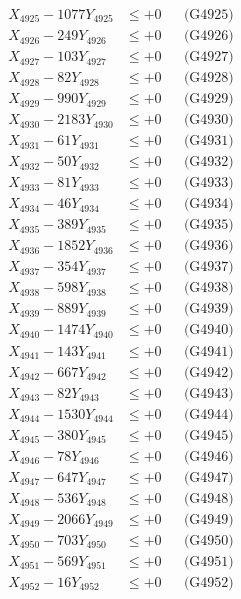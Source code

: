 \documentclass[a4paper,10pt]{article}
\begin{document}
{\begin{align}
X_{4925} - 1077Y_{4925} &\leq +0 && \text{(G4925)} \\
X_{4926} - 249Y_{4926} &\leq +0 && \text{(G4926)} \\
X_{4927} - 103Y_{4927} &\leq +0 && \text{(G4927)} \\
X_{4928} - 82Y_{4928} &\leq +0 && \text{(G4928)} \\
X_{4929} - 990Y_{4929} &\leq +0 && \text{(G4929)} \\
X_{4930} - 2183Y_{4930} &\leq +0 && \text{(G4930)} \\
\allowbreak
X_{4931} - 61Y_{4931} &\leq +0 && \text{(G4931)} \\
X_{4932} - 50Y_{4932} &\leq +0 && \text{(G4932)} \\
X_{4933} - 81Y_{4933} &\leq +0 && \text{(G4933)} \\
X_{4934} - 46Y_{4934} &\leq +0 && \text{(G4934)} \\
X_{4935} - 389Y_{4935} &\leq +0 && \text{(G4935)} \\
X_{4936} - 1852Y_{4936} &\leq +0 && \text{(G4936)} \\
X_{4937} - 354Y_{4937} &\leq +0 && \text{(G4937)} \\
X_{4938} - 598Y_{4938} &\leq +0 && \text{(G4938)} \\
X_{4939} - 889Y_{4939} &\leq +0 && \text{(G4939)} \\
X_{4940} - 1474Y_{4940} &\leq +0 && \text{(G4940)} \\
\allowbreak
X_{4941} - 143Y_{4941} &\leq +0 && \text{(G4941)} \\
X_{4942} - 667Y_{4942} &\leq +0 && \text{(G4942)} \\
X_{4943} - 82Y_{4943} &\leq +0 && \text{(G4943)} \\
X_{4944} - 1530Y_{4944} &\leq +0 && \text{(G4944)} \\
X_{4945} - 380Y_{4945} &\leq +0 && \text{(G4945)} \\
X_{4946} - 78Y_{4946} &\leq +0 && \text{(G4946)} \\
X_{4947} - 647Y_{4947} &\leq +0 && \text{(G4947)} \\
X_{4948} - 536Y_{4948} &\leq +0 && \text{(G4948)} \\
X_{4949} - 2066Y_{4949} &\leq +0 && \text{(G4949)} \\
X_{4950} - 703Y_{4950} &\leq +0 && \text{(G4950)} \\
\allowbreak
X_{4951} - 569Y_{4951} &\leq +0 && \text{(G4951)} \\
X_{4952} - 16Y_{4952} &\leq +0 && \text{(G4952)} \\

\end{align}}
\end{document}
